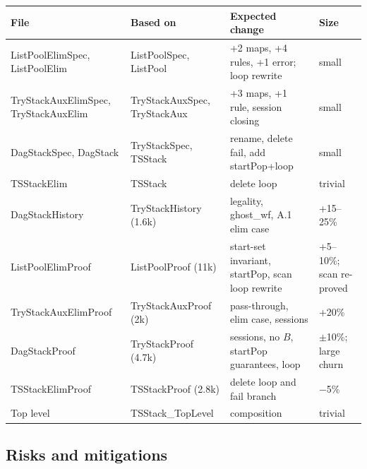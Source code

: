 \documentclass[11pt]{article}
\theoremstyle{definition}
\theoremstyle{remark}
\begin{document}
\begin{center}
\small
\begin{tabularx}{\textwidth}{@{}>{\raggedright\arraybackslash}p{3.3cm}>{\raggedright\arraybackslash}p{3.0cm}Xl@{}}
\toprule
File & Based on & Expected change & Size \\
\midrule
ListPoolElimSpec, ListPoolElim & ListPoolSpec, ListPool & +2 maps, +4 rules, +1 error; loop rewrite & small \\
TryStackAuxElimSpec, TryStackAuxElim & TryStackAuxSpec, TryStackAux & +3 maps, +1 rule, session closing & small \\
DagStackSpec, DagStack & TryStackSpec, TSStack & rename, delete fail, add startPop+loop & small \\
TSStackElim & TSStack & delete loop & trivial \\
DagStackHistory & TryStackHistory (1.6k) & legality, ghost\_wf, A.1 elim case & +15--25\% \\
ListPoolElimProof & ListPoolProof (11k) & start-set invariant, startPop, scan loop rewrite & +5--10\%; scan re-proved \\
TryStackAuxElimProof & TryStackAuxProof (2k) & pass-through, elim case, sessions & +20\% \\
DagStackProof & TryStackProof (4.7k) & sessions, no $B$, startPop guarantees, loop & $\pm$10\%; large churn \\
TSStackElimProof & TSStackProof (2.8k) & delete loop and fail branch & $-$5\% \\
Top level & TSStack\_TopLevel & composition & trivial \\
\bottomrule
\end{tabularx}
\end{center}

\subsection{Risks and mitigations}
\label{sec:risks}
\end{document}
